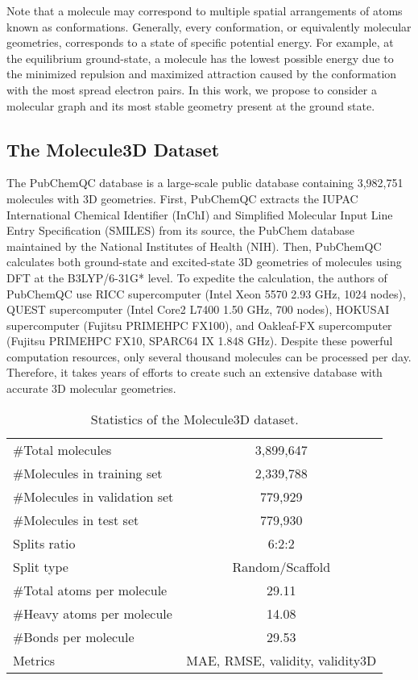 \documentclass{article}
\begin{document}
Note that a molecule may correspond to multiple spatial arrangements of atoms known as conformations. Generally, every conformation, or equivalently molecular geometries, corresponds to a state of specific potential energy. For example, at the equilibrium ground-state, a molecule has the lowest possible energy due to the minimized repulsion and maximized attraction caused by the conformation with the most spread electron pairs. In this work, we propose to consider a molecular graph and its most stable geometry present at the ground state. 




\subsection{The Molecule3D Dataset}
The PubChemQC database is a large-scale public database containing 3,982,751 molecules with 3D geometries. First, PubChemQC extracts the IUPAC International Chemical Identifier (InChI) and Simplified Molecular Input Line Entry Specification (SMILES) from its source, the PubChem database \cite{kim2016pubchem} maintained by the National Institutes of Health (NIH). Then, PubChemQC calculates both ground-state and excited-state 3D geometries of molecules using DFT at the B3LYP/6-31G* level. To expedite the calculation, the authors of PubChemQC use RICC supercomputer (Intel Xeon 5570 2.93 GHz, 1024 nodes), QUEST supercomputer (Intel Core2 L7400 1.50 GHz, 700 nodes), HOKUSAI supercomputer (Fujitsu PRIMEHPC FX100), and Oakleaf-FX supercomputer (Fujitsu PRIMEHPC FX10, SPARC64 IX 1.848 GHz). Despite these powerful computation resources, only several thousand molecules can be processed per day. Therefore, it takes years of efforts to create such an extensive database with accurate 3D molecular geometries.

\begin{wraptable}{r}{0.65\textwidth}\vspace{-0.5cm}
\small
    \centering
    \caption{Statistics of the Molecule3D dataset.}
    \begin{tabular}{lc}
\toprule
$\#$Total molecules & 3,899,647 \\
    $\#$Molecules in training set& 2,339,788 \\
    $\#$Molecules in validation set& 779,929 \\
    $\#$Molecules in test set& 779,930 \\
    Splits ratio & 6:2:2 \\
    Split type & Random/Scaffold \\
    $\#$Total atoms per molecule & 29.11 \\
    $\#$Heavy atoms per molecule & 14.08 \\
    $\#$Bonds per molecule & 29.53 \\
    Metrics & MAE, RMSE, validity, validity3D \\
    \bottomrule
    \end{tabular}
    \label{tab:stat}
\end{wraptable}
\end{document}
